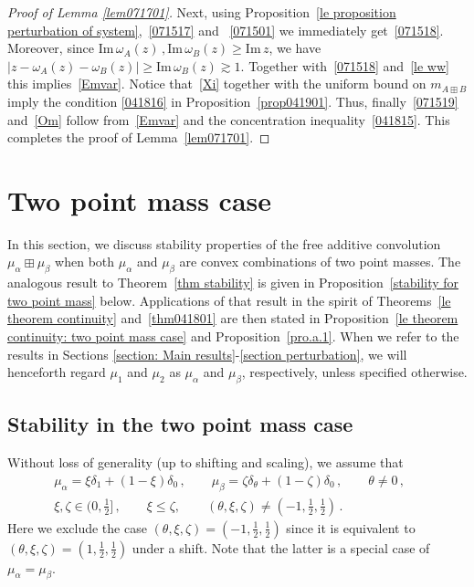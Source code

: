\documentclass[10pt,reqno]{amsart}
\numberwithin{equation}{section}
\theoremstyle{plain}
\numberwithin{kevin}{section}
\theoremstyle{remark}
\renewcommand{\Im}{\mathrm{Im}\,}
\newcommand{\im}{\mathrm{Im}\,}
\begin{document}
\begin{proof}[Proof of Lemma \ref{lem071701}]
Next, using Proposition~\ref{le proposition perturbation of system},~\eqref{071517} and ~\eqref{071501} we immediately get~\eqref{071518}. Moreover, since $\im \omega_A(z)\,,\im \omega_B(z)\ge \im z$, we have $|z-\omega_A(z)-\omega_B(z)|\geq \Im \omega_B(z)\gtrsim 1$. Together with~\eqref{071518} and~\eqref{le ww} 
this implies~\eqref{Emvar}. Notice that~\eqref{Xi} together with the uniform bound on $m_{A\boxplus B}$
imply the condition \eqref{041816} in Proposition~\ref{prop041901}.
Thus,  finally~\eqref{071519} and~\eqref{Om} follow from~\eqref{Emvar}
 and the concentration inequality~\eqref{041815}. This completes the proof of Lemma~\ref{lem071701}.\qedhere\end{proof}




\section{Two point mass case}\label{le final section}
In this section, we discuss stability properties of the free additive convolution $\mu_\alpha\boxplus\mu_\beta$ when both $\mu_\alpha$ and $\mu_\beta$ are convex combinations of two point masses. The analogous result to Theorem~\ref{thm stability} is given in Proposition~\ref{stability for two point mass} below. Applications of that result in the spirit of Theorems~\ref{le theorem continuity} and~\ref{thm041801} are then stated in Proposition~\ref{le theorem continuity: two point mass case} and Proposition~\ref{pro.a.1}. When we refer to the results in Sections \ref{section: Main results}-\ref{section perturbation}, we will henceforth regard $\mu_1$ and $\mu_2$ as $\mu_\alpha$ and $\mu_\beta$, respectively, unless specified otherwise.

\subsection{Stability in the two point mass case}
Without loss of generality (up to shifting and scaling), we assume that
\begin{align}
&\mu_\alpha=\xi\delta_1+(1-\xi)\delta_0\,,\qquad \mu_\beta=\zeta\delta_{\theta}+(1-\zeta)\delta_0\,,\qquad \theta\neq 0\,,\qquad\nonumber\\
 & \xi,\zeta\in (0,\frac{1}{2}]\,, \qquad \xi\leq \zeta,\qquad (\theta, \xi,\zeta)\neq (-1,\frac12,\frac12)\,. \label{081210}
\end{align}
Here we exclude the case  $(\theta, \xi,\zeta)=(-1,\frac12,\frac12)$ since it is equivalent to $(\theta, \xi,\zeta)=(1,\frac12,\frac12)$ under a shift. Note that the latter is a special case of $\mu_\alpha=\mu_\beta$. 
\end{document}
